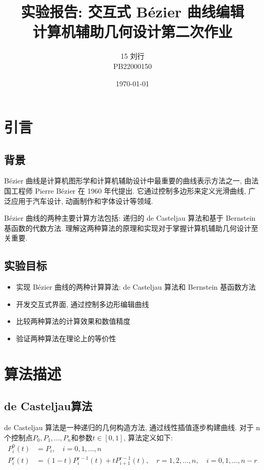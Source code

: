 \documentclass[12pt,a4paper]{report}
\title{
    \vspace{3cm}
    \textbf{实验报告: 交互式 Bézier 曲线编辑}\\[0.5cm]
    \Large 计算机辅助几何设计第二次作业\\[0.5cm]
    \vspace{2cm}
}
\author{15 刘行 \\ PB22000150}
\date{\today}
\begin{document}
    \maketitle
    \tableofcontents
    \newpage

    \chapter{引言}
        \section{背景}
            Bézier 曲线是计算机图形学和计算机辅助设计中最重要的曲线表示方法之一, 由法国工程师 Pierre Bézier 在 1960 年代提出. 它通过控制多边形来定义光滑曲线, 广泛应用于汽车设计, 动画制作和字体设计等领域.
            
            Bézier 曲线的两种主要计算方法包括: 递归的 de Casteljau 算法和基于 Bernstein 基函数的代数方法. 理解这两种算法的原理和实现对于掌握计算机辅助几何设计至关重要.

        \section{实验目标}
            \begin{itemize}
                \item 实现 Bézier 曲线的两种计算算法: de Casteljau 算法和 Bernstein 基函数方法
                \item 开发交互式界面, 通过控制多边形编辑曲线
                \item 比较两种算法的计算效果和数值精度
                \item 验证两种算法在理论上的等价性
            \end{itemize}

    \chapter{算法描述}
        \section{de Casteljau算法}
            de Casteljau 算法是一种递归的几何构造方法, 通过线性插值逐步构建曲线. 对于 n 个控制点$P_{0}, P_{1}, \dots, P_{n}$和参数$t \in \left[0,1\right]$, 算法定义如下:
            \begin{align*}
                P_{i}^{0}\left(t\right) &= P_{i}, \quad i = 0, 1, \dots, n \\
                P_{i}^{r}\left(t\right) &= \left(1 - t\right)P_{i}^{r-1}\left(t\right) + tP_{i+1}^{r-1}\left(t\right), \quad r = 1, 2, \dots, n, \quad i = 0, 1, \dots, n - r
            \end{align*}
            
\end{document}
